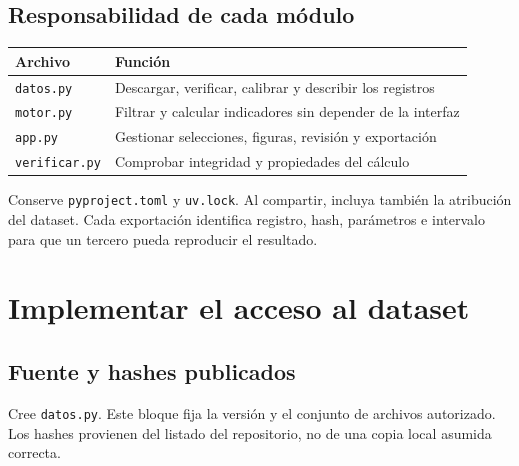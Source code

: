\documentclass[
  spanish,
  10.5pt,
  a4paper,
  DIV=11,
  numbers=noendperiod]{scrartcl}
\newcounter{none} %
\begin{document}
\subsection{Responsabilidad de cada
módulo}\label{responsabilidad-de-cada-muxf3dulo}

{\def\LTcaptype{none} %
\begin{longtable}[]{@{}
  >{\raggedright\arraybackslash}p{}
  >{\raggedright\arraybackslash}p{}@{}}
\toprule\noalign{}
\begin{minipage}[b]{\linewidth}\raggedright
Archivo
\end{minipage} & \begin{minipage}[b]{\linewidth}\raggedright
Función
\end{minipage} \\
\midrule\noalign{}
\endhead
\bottomrule\noalign{}
\endlastfoot
\texttt{datos.py} & Descargar, verificar, calibrar y describir los
registros \\
\texttt{motor.py} & Filtrar y calcular indicadores sin depender de la
interfaz \\
\texttt{app.py} & Gestionar selecciones, figuras, revisión y
exportación \\
\texttt{verificar.py} & Comprobar integridad y propiedades del
cálculo \\
\end{longtable}
}

Conserve \texttt{pyproject.toml} y \texttt{uv.lock}. Al compartir,
incluya también la atribución del dataset. Cada exportación identifica
registro, hash, parámetros e intervalo para que un tercero pueda
reproducir el resultado.

\section{Implementar el acceso al
dataset}\label{implementar-el-acceso-al-dataset}

\subsection{Fuente y hashes
publicados}\label{fuente-y-hashes-publicados}

Cree \texttt{datos.py}. Este bloque fija la versión y el conjunto de
archivos autorizado. Los hashes provienen del listado del repositorio,
no de una copia local asumida correcta.
\end{document}
